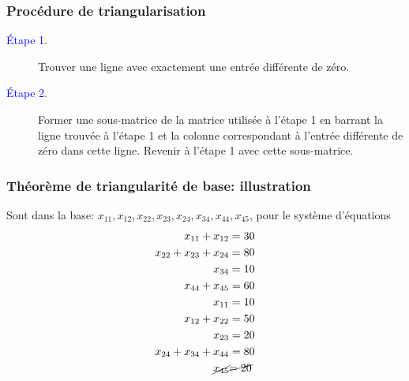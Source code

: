 \documentclass[usepdftitle=false]{beamer}
\begin{document}
\begin{frame}
\frametitle{Procédure de triangularisation}

\begin{description}
	\item[\textcolor{blue}{Étape 1.}]
Trouver une ligne avec exactement une entrée différente de zéro.
	\item[\textcolor{blue}{Étape 2.}]
Former une sous-matrice de la matrice utilisée à l'étape 1 en barrant la ligne
trouvée à l'étape 1 et la colonne correspondant à l'entrée différente de zéro dans cette ligne.
Revenir à l'étape 1 avec cette sous-matrice.
\end{description}

\end{frame}

\begin{frame}
\frametitle{Théorème de triangularité de base: illustration}

Sont dans la base: $x_{11}, x_{12}, x_{22}, x_{23}, x_{24}, x_{34}, x_{44}, x_{45}$, pour le système d'équations
\begin{align*}
x_{11} + x_{12} &= 30 \\
x_{22} + x_{23} + x_{24} &= 80 \\
x_{34} &= 10 \\
x_{44} + x_{45} &= 60 \\
x_{11} & = 10 \\
x_{12} + x_{22} &= 50 \\
x_{23} &= 20 \\
x_{24} + x_{34} + x_{44} &= 80 \\
\cancel{x_{45}} &\cancel{= 20}
\end{align*}

\end{frame}
\end{document}

